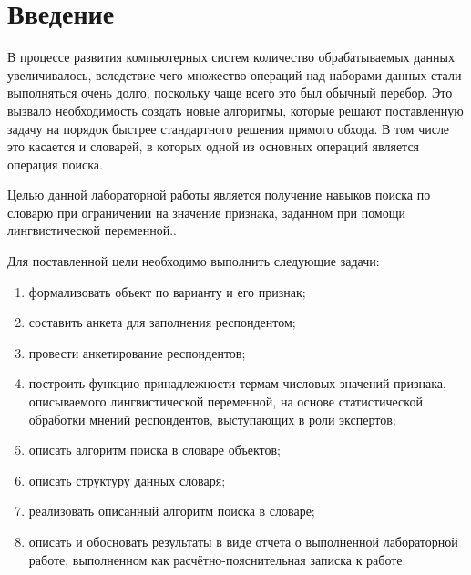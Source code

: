 \chapter*{Введение}

В процессе развития компьютерных систем количество обрабатываемых данных увеличивалось, вследствие чего множество операций над наборами данных стали выполняться очень долго, поскольку чаще всего это был обычный перебор. 
Это вызвало необходимость создать новые алгоритмы, которые решают поставленную задачу на порядок быстрее стандартного решения прямого обхода. 
В том числе это касается и словарей, в которых одной из основных операций является операция поиска.


Целью данной лабораторной работы является получение навыков поиска по словарю при ограничении на значение признака, заданном при помощи лингвистической переменной..

Для поставленной цели необходимо выполнить следующие задачи:
\begin{enumerate}
	\item формализовать объект по варианту и его признак;
	\item составить анкета для заполнения респондентом;
	\item провести анкетирование респондентов;
	\item построить функцию принадлежности термам числовых значений признака, описываемого лингвистической переменной, на основе статистической обработки мнений респондентов, выступающих в роли экспертов;
	\item описать алгоритм поиска в словаре объектов;
	\item описать структуру данных словаря;
	\item реализовать описанный алгоритм поиска в словаре;
	\item описать и обосновать результаты в виде отчета о выполненной лабораторной работе, выполненном как расчётно-пояснительная записка к работе.
\end{enumerate}